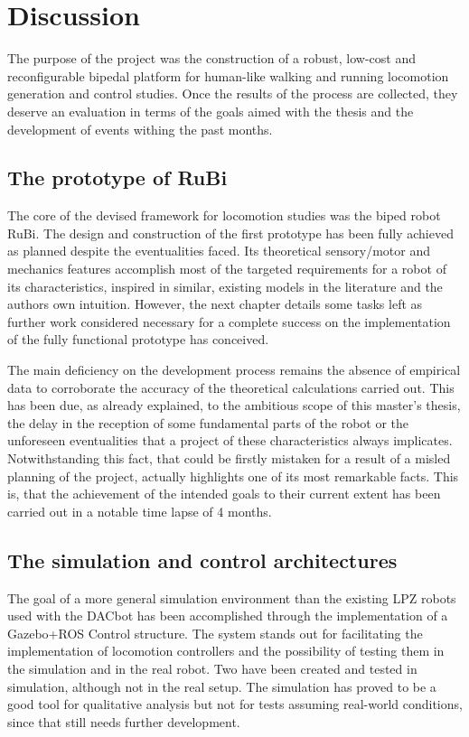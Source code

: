 \chapter{Discussion} %
\label{cha:discussion}
The purpose of the project was the construction of a robust, low-cost
and reconfigurable bipedal platform for human-like walking and running locomotion
generation and control studies.
Once the results of the process are collected, they deserve an evaluation in terms of the goals aimed with the thesis and the development of events withing the past months.

\section{The prototype of RuBi} %
\label{sec:the_prototype_of_rubi}
The core of the devised framework for locomotion studies was the biped robot RuBi.
The design and construction of the first prototype has been fully achieved as planned despite the eventualities faced.
Its theoretical sensory/motor and mechanics features accomplish most of the targeted requirements for a robot of its characteristics, inspired in similar, existing models in the literature and the authors own intuition.
However, the next chapter details some tasks left as further work considered necessary for a complete success on the implementation of the fully functional prototype has conceived.

The main deficiency on the development process remains the absence of empirical data to corroborate the accuracy of the theoretical calculations carried out.
This has been due, as already explained, to the ambitious scope of this master's thesis, the delay in the reception of some fundamental parts of the robot or the unforeseen eventualities that a project of these characteristics always implicates.
Notwithstanding this fact, that could be firstly mistaken for a result of a misled planning of the project, actually highlights one of its most remarkable facts.
This is, that the achievement of the intended goals to their current extent has been carried out in a notable time lapse of 4 months.

\section{The simulation and control architectures} %
\label{sec:the_simulation_and_control_architectures}
The goal of a more general simulation environment than the existing LPZ robots used with the DACbot has been accomplished through the implementation of a Gazebo+ROS Control structure.
The system stands out for facilitating the implementation of locomotion controllers and the possibility of testing them in the simulation and in the real robot.
Two have been created and tested in simulation, although not in the real setup.
The simulation has proved to be a good tool for qualitative analysis but not for tests assuming real-world conditions, since that still needs further development.

